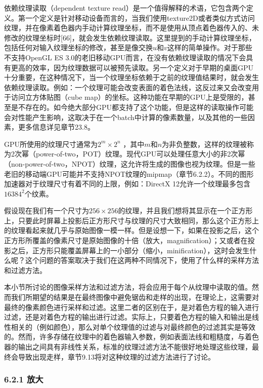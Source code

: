 \documentclass[
  paper=a4,
  ,captions=tableheading
]{scrartcl}
\begin{document}
依赖纹理读取（dependent texture
read）是一个值得解释的术语，它包含两个定义。第一个定义是针对移动设备而言的，当我们使用texture2D或者类似方式访问纹理，并在像素着色器内手动计算纹理坐标，而不是使用从顶点着色器传入的、未修改的纹理坐标时{[}66{]}，就会发生依赖纹理读取。这里提到的手动计算纹理坐标，包括任何对输入纹理坐标的修改，甚至是像交换\(u\)和\(v\)这样的简单操作。对于那些不支持OpenGL ES 3.0的老旧移动GPU而言，在没有依赖纹理读取的情况下会具有更高的效率，因为纹理数据可以被预先读取。另一个定义对于早期的桌面GPU十分重要，在这种情况下，当一个纹理坐标依赖于之前的纹理值结果时，就会发生依赖纹理读取。例如：一个纹理可能会改变表面的着色法线，这反过来又会改变用于访问立方体贴图（cube
map）的坐标。这种功能在早期的GPU上是受限的，甚至是不存在的。如今绝大部分GPU都支持了这个功能，但是这样的读取操作可能会对性能产生影响，这取决于在一个batch中计算的像素数量，以及其他的一些因素，更多信息详见章节23.8。


GPU所使用的纹理尺寸通常为\(2^m \times 2^n\)
，其中\(m\)和\(n\)为非负整数，这样的纹理被称为2次幂（power-of-two，POT）纹理。现代GPU可以处理任意大小的非2次幂（non-power-of-two，NPOT）纹理，这允许将生成的图像也视为纹理。但是一些老旧的移动端GPU可能并不支持NPOT纹理的mipmap（章节6.2.2）。不同的图形加速器对于纹理尺寸有着不同的上限，例如：DirectX
12允许一个纹理最多包含\(16384^2\)个纹素。

假设现在我们有一个尺寸为\(256 \times 256\)的纹理，并且我们想将其显示在一个正方形上，只要此时屏幕上投影后正方形尺寸与纹理的尺寸大致相同，那么这个正方形上的纹理看起来就几乎与原始图像一模一样。但是设想一下，如果在投影之后，这个正方形所覆盖的像素尺寸是原始图像的十倍（放大，magnification）；又或者在投影之后，正方形只能覆盖屏幕上的一小部分（缩小，minification），这时会发生什么呢？这个问题的答案取决于我们在这两种不同情况下，使用了什么样的采样方法和过滤方法。

本小节所讨论的图像采样方法和过滤方法，将会应用于每个从纹理中读取的值。然而我们所期望的结果是在最终图像中避免锯齿和走样的出现，在理论上，这需要对最终的像素颜色进行采样和过滤。这里二者的区别在于，是对着色方程的输入进行过滤，还是对着色方程的输出进行过滤。实际上，只要着色方程的输入和输出是线性相关的（例如颜色），那么对单个纹理值的过滤与对最终颜色的过滤其实是等效的。然而，许多存储在纹理中的着色器输入参数，例如表面法线和粗糙度，与着色器的输出之间具有非线性关系，标准的纹理过滤方法不能很好地处理这些纹理，最终会导致出现走样，章节9.13将对这种纹理的过滤方法进行了讨论。

\subsubsection{6.2.1 放大}\label{ux653eux5927}
\end{document}
